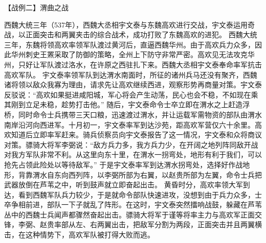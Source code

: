 \documentclass[a4paper,12pt,UTF8,twoside]{ctexbook}
\begin{document}
【战例二】渭曲之战

西魏大统三年（537年），西魏大丞相宇文泰与东魏高欢进行交战，宇文泰运用奇战，以正面突击和两翼夹击的综合战术，成功打败了东魏高欢的进犯。
西魏大统三年，东魏将领高欢率领军队渡过黄河后，直逼西魏华州。由于高欢兵力众多，因此华州刺史王罴采取了防御的策略，全州上下防守非常严密。高欢见无法攻克华州，只好让军队渡过洛水，在许原之西驻扎下来。西魏大丞相宇文泰奉命率军抗击高欢军队。
宇文泰率领军队到达渭水南面时，所征的诸州兵马还没有聚齐，西魏诸将领以敌众我寡为理由，请求先让高欢继续西进，观察形势再商量对策。宇文泰反驳说：“高欢如果挺进咸阳城，军心将会产生动荡，民心也会不稳，不如现在乘其刚到立足未稳，趁势打击他。”
随后，宇文泰命令士卒立即在渭水之上赶造浮桥，同时命令士兵携带三天口粮，迅速渡过渭水，并让运载军需物资的部队由渭水南岸沿河向西进军。十月初一，宇文泰率军到达沙苑，距高欢军营仅六十余里。高欢知道后立即率军赶来。骑兵侦察员向宇文泰报告了这一情况，宇文泰和众将商议对策。骠骑大将军李弼说：“敌方兵力多，我方兵力少，在开阔之地列阵同敌开战对我方军队非常不利。从这里向东十里，在渭水一拐弯处，地形有利于我们，可以抢先占领此险处以等待敌军。”
于是宇文泰率军到达渭水拐弯处，选择好作战地形，背靠渭水自东向西列阵，以李弼所部为右翼，以赵贵所部为左翼，命令士兵把武器放倒在芦苇之中，听到鼓声就立即奋起出击。
黄昏时分，高欢率领大军到达，看到西魏军队兵力较少，于是就命令部队快速进攻，没想到由于兵力众多，士卒争相前进，部队一下子就乱了阵形。在这时，宇文泰突然擂响战鼓，躲藏在芦苇丛中的西魏士兵闻声都骤然奋起出击。骠骑大将军于谨等将率主力与高欢军正面交锋，李弼、赵贵率部从左、右两翼出击，把敌军分割为两段，正面突击并且两翼横击，在这种情势下，高欢军队被打得大败而逃。


\backmatter
\end{document}
